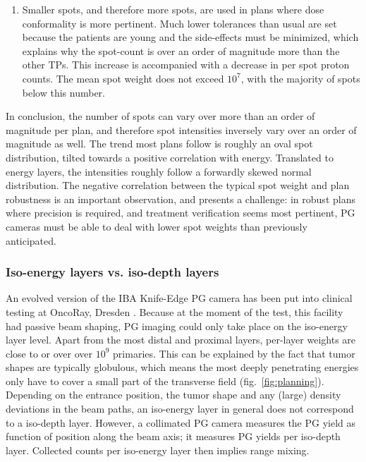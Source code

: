 \documentclass[a4paper,english]{article}
\begin{document}
\begin{enumerate}[noitemsep]
\item[] Smaller spots, and therefore more spots, are used in plans where dose conformality is more pertinent. Much lower tolerances than usual are set because the patients are young and the side-effects must be minimized, which explains why the spot-count is over an order of magnitude more than the other TPs. This increase is accompanied with a decrease in per spot proton counts. The mean spot weight does not exceed $10^7$, with the majority of spots below this number.
\end{enumerate}

In conclusion, the number of spots can vary over more than an order of magnitude per plan, and therefore spot intensities inversely vary over an order of magnitude as well. The trend most plans follow is roughly an oval spot distribution, tilted towards a positive correlation with energy. Translated to energy layers, the intensities roughly follow a forwardly skewed normal distribution. The negative correlation between the typical spot weight and plan robustness is an important observation, and presents a challenge: in robust plans where precision is required, and treatment verification seems most pertinent, PG cameras must be able to deal with lower spot weights than previously anticipated. %

\subsubsection{Iso-energy layers vs. iso-depth layers}\label{sec:layers}

An evolved version of the IBA Knife-Edge PG camera has been put into clinical testing at OncoRay, Dresden \citep{Richter2016}. Because at the moment of the test, this facility had passive beam shaping, PG imaging could only take place on the iso-energy layer level. Apart from the most distal and proximal layers, per-layer weights are close to or over over $10^9$ primaries. This can be explained by the fact that tumor shapes are typically globulous, which means the most deeply penetrating energies only have to cover a small part of the transverse field (fig.~\ref{fig:planning}). Depending on the entrance position, the tumor shape and any (large) density deviations in the beam paths, an iso-energy layer in general does not correspond to a iso-depth layer. However, a collimated PG camera measures the PG yield as function of position along the beam axis; it measures PG yields per iso-depth layer. Collected counts per iso-energy layer then implies range mixing.
\end{document}
